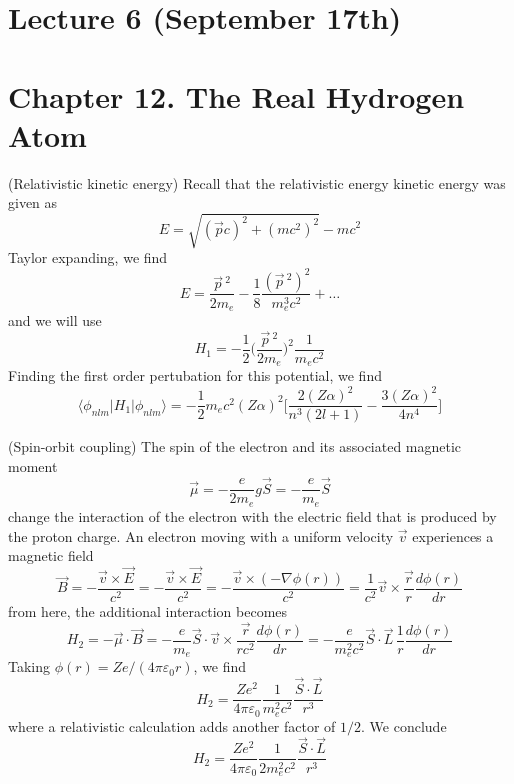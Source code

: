 \section{Lecture 6 (September 17th)}
\section{Chapter 12. The Real Hydrogen Atom}
\begin{lem}
(Relativistic kinetic energy) Recall that the relativistic energy kinetic energy was given as
\[E=\sqrt{(\vec{p}c)^2+(mc^2)^2}-mc^2\]
Taylor expanding, we find
\[E=\dfrac{\vec{p}\,^2}{2m_{e}}-\dfrac{1}{8}\dfrac{(\vec{p}\,^2)^2}{m^3_{e}c^2}+\ldots \]
and we will use
\[H_1=-\dfrac{1}{2}\Big(\dfrac{\vec{p}\,^2}{2m_{e}}\Big)^2\dfrac{1}{m_{e}c^2}\]
Finding the first order pertubation for this potential, we find
\[\langle \phi _{nlm}|H_1|\phi _{nlm}\rangle =-\dfrac{1}{2}m_{e}c^2(Z\alpha )^2\Big[\dfrac{2(Z\alpha )^2}{n^3(2l+1)}-\dfrac{3(Z\alpha )^2}{4n^{4}}\Big]\]

\end{lem}
\vspace{2ex}
\begin{lem}
(Spin-orbit coupling) The spin of the electron and its associated magnetic moment 
\[\vec{\mu }=-\dfrac{e}{2m_{e}}g\vec{S}=-\dfrac{e}{m_{e}}\vec{S}\]
change the interaction of the electron with the electric field that is produced by the proton charge. An electron moving with a uniform velocity $\vec{v}$ experiences a magnetic field
\[\vec{B}=-\dfrac{\vec{v}\times \vec{E}}{c^2}=-\dfrac{\vec{v}\times \vec{E}}{c^2}=-\dfrac{\vec{v}\times (-\nabla \phi (r))}{c^2}=\dfrac{1}{c^2}\vec{v}\times \dfrac{\vec{r}}{r}\dfrac{d \phi (r)}{d r} \]
from here, the additional interaction becomes
\[H_{2}=-\vec{\mu }\cdot \vec{B}=-\dfrac{e}{m_{e}}\vec{S}\cdot \vec{v}\times \dfrac{\vec{r}}{rc^2}\dfrac{d \phi (r)}{d r}=-\dfrac{e}{m_{e}^2c^2}\vec{S}\cdot \vec{L}\,\dfrac{1}{r}\dfrac{d \phi (r)}{d r}  \]
Taking $\phi (r)=Ze/(4\pi \varepsilon_0 r)$, we find
\[H_{2}=\dfrac{Ze^2}{4\pi \varepsilon_0}\dfrac{1}{m^2_{e}c^2}\dfrac{\vec{S}\cdot \vec{L}}{r^3}\]
where a relativistic calculation adds another factor of $1/2$. We conclude
\[H_{2}=\dfrac{Ze^2}{4\pi \varepsilon _{0}}\dfrac{1}{2m_{e}^2c^2}\dfrac{\vec{S}\cdot \vec{L}}{r^3}\]

\end{lem}
\vspace{2ex}

